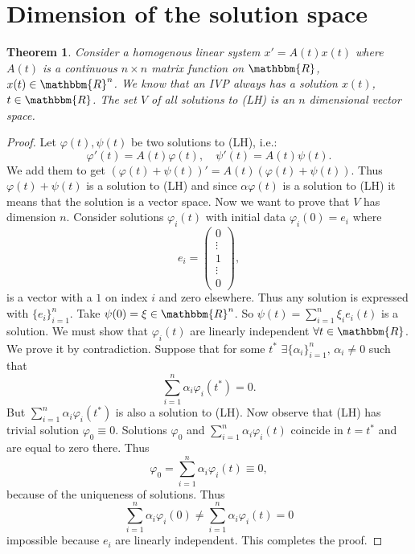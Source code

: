 \documentclass[12pt, a4paper]{article}
\newcommand{\R}{\ensuremath{\mathbbm{R}}}
\newtheorem{theorem}{Theorem}[section]
\begin{document}
\section{Dimension of the
solution space}
\begin{theorem}
Consider a homogenous linear system $x' = A(t)x(t)$ where $A(t)$ is a continuous $n\times n$ matrix function on $\R$, $x(t)\in \R^n$. We know that an IVP always has a solution $x(t)$, $t\in\R$. The set $V$ of all solutions to (LH) is an $n$ dimensional vector space.
\end{theorem}
\begin{proof}
Let $\varphi(t), \psi(t)$ be two solutions to (LH), i.e.:
\begin{equation*}
\varphi'(t) = A(t)\varphi(t), \quad \psi'(t) = A(t) \psi(t).
\end{equation*}
We add them to get $(\varphi(t) + \psi(t))' = A(t)(\varphi(t) + \psi(t))$. Thus $\varphi(t) + \psi(t)$ is a solution to (LH) and since $\alpha\varphi(t)$ is a solution to (LH) it means that the solution is a vector space. Now we want to prove that $V$ has dimension $n$. Consider solutions $\varphi_i(t)$ with initial data $\varphi_i(0)=e_i$ where
\begin{equation*}
e_i =
 \begin{pmatrix}
  0  \\
  \vdots  \\
  1 \\
  \vdots \\
  0
 \end{pmatrix},
\end{equation*}
is a vector with a $1$ on index $i$ and zero elsewhere. Thus any solution is expressed with $\{e_i\}_{i=1}^n$. Take $\psi(0)=\xi\in\R^n$. So $\psi(t) = \sum_{i=1}^n \xi_i e_i(t)$ is a solution. We must show that $\varphi_i(t)$ are linearly independent $\forall t\in\R$. We prove it by contradiction. Suppose that for some $t^*$ $\exists \{\alpha_i\}_{i=1}^n,\, \alpha_i\neq0$ such that
\begin{equation*}
\sum_{i=1}^n \alpha_i \varphi_i(t^*) = 0.
\end{equation*}
But $\sum_{i=1}^n \alpha_i \varphi_i(t^*)$ is also a solution to (LH). Now observe that (LH) has trivial solution $\varphi_0 \equiv 0$. Solutions $\varphi_0$ and $\sum_{i=1}^n \alpha_i \varphi_i(t)$ coincide in $t=t^*$ and are equal to zero there. Thus
\begin{equation*}
\varphi_0 = \sum_{i=1}^n \alpha_i \varphi_i(t) \equiv 0,
\end{equation*}
because of the uniqueness of solutions. Thus
\begin{equation*}
 \sum_{i=1}^n \alpha_i \varphi_i(0) \neq  \sum_{i=1}^n \alpha_i \varphi_i(t) = 0
\end{equation*}
impossible because $e_i$ are linearly independent. This completes the proof.
\end{proof}
\end{document}
